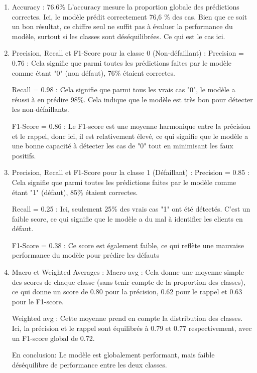\begin{enumerate}
\item Accuracy : 76.6\%
L'accuracy mesure la proportion globale des prédictions correctes. Ici, le modèle prédit correctement 76,6 \% des cas. Bien que ce soit un bon résultat, ce chiffre seul ne suffit pas à évaluer la performance du modèle, surtout si les classes sont déséquilibrées. Ce qui est le cas ici.

\item Precision, Recall et F1-Score pour la classe 0 (Non-défaillant) :
Precision = 0.76 : Cela signifie que parmi toutes les prédictions faites par le modèle comme étant "0" (non défaut), 76\% étaient correctes.

Recall = 0.98 : Cela signifie que parmi tous les vrais cas "0", le modèle a réussi à en prédire 98\%. Cela indique que le modèle est très bon pour détecter les non-défaillants.

F1-Score = 0.86 : Le F1-score est une moyenne harmonique entre la précision et le rappel, donc ici, il est relativement élevé, ce qui signifie que le modèle a une bonne capacité à détecter les cas de "0" tout en minimisant les faux positifs.

\item Precision, Recall et F1-Score pour la classe 1 (Défaillant) :
Precision = 0.85 : Cela signifie que parmi toutes les prédictions faites par le modèle comme étant "1" (défaut), 85\% étaient correctes.

Recall = 0.25 : Ici, seulement 25\% des vrais cas "1" ont été détectés. C'est un faible score, ce qui signifie que le modèle a du mal à identifier les clients en défaut.

F1-Score = 0.38 : Ce score est également faible, ce qui reflète une mauvaise performance du modèle pour prédire les défauts

\item Macro et Weighted Averages :
Macro avg : Cela donne une moyenne simple des scores de chaque classe (sans tenir compte de la proportion des classes), ce qui donne un score de 0.80 pour la précision, 0.62 pour le rappel et 0.63 pour le F1-score.

Weighted avg : Cette moyenne prend en compte la distribution des classes. Ici, la précision et le rappel sont équilibrés à 0.79 et 0.77 respectivement, avec un F1-score global de 0.72.

En conclusion:
Le modèle est globalement performant, mais faible déséquilibre de performance entre les deux classes.
\end{enumerate}

